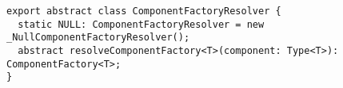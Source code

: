 \begin{verbatim}
export abstract class ComponentFactoryResolver {
  static NULL: ComponentFactoryResolver = new _NullComponentFactoryResolver();
  abstract resolveComponentFactory<T>(component: Type<T>): ComponentFactory<T>;
}
\end{verbatim}

